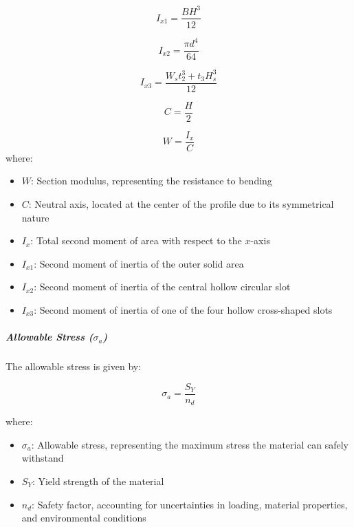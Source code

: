 \documentclass[../../main]{subfiles}
\begin{document}
\begin{equation}
  I_{x1} = \frac{BH^3}{12} 
\end{equation}

\begin{equation}
  I_{x2} = \frac{\pi d^4}{64} 
\end{equation}

\begin{equation}
  I_{x3} = \frac{W_s t_2^3 + t_3 H_s^3}{12} 
\end{equation}

\begin{equation}
  C = \frac{H}{2} 
\end{equation}

\begin{equation}
  W = \frac{I_x}{C} 
\end{equation}
where:

\begin{itemize}
    \item $W$: Section modulus, representing the resistance to bending
    \item $C$: Neutral axis, located at the center of the profile due to its symmetrical nature
    \item $I_x$: Total second moment of area with respect to the $x$-axis
    \item $I_{x1}$: Second moment of inertia of the outer solid area
    \item $I_{x2}$: Second moment of inertia of the central hollow circular slot
    \item $I_{x3}$: Second moment of inertia of one of the four hollow cross-shaped slots
\end{itemize}

\subparagraph{Allowable Stress ($\sigma_a$)}
The allowable stress is given by:

\begin{equation}
    \sigma_a = \frac{S_Y}{n_d} \tag{28}
\end{equation}

where:

\begin{itemize}
    \item $\sigma_a$: Allowable stress, representing the maximum stress the material can safely withstand
    \item $S_Y$: Yield strength of the material
    \item $n_d$: Safety factor, accounting for uncertainties in loading, material properties, and environmental conditions
\end{itemize}
\end{document}
